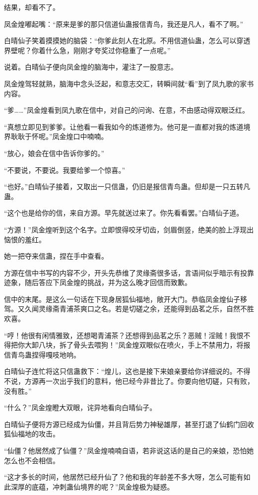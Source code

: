 \begin{this_body}
结果，却看不了。

凤金煌嘟起嘴：“原来是爹的那只信道仙蛊报信青鸟，我还是凡人，看不了啊。”

白晴仙子笑着摸摸她的脑袋：“你爹此刻人在北原。不用信道仙蛊，怎么可以穿透界壁呢？你着什么急，刚刚才夸奖过你稳重了一点呢。”

说着。白晴仙子便向凤金煌的脑海中，灌注了一股意志。

凤金煌驾轻就熟，脑海中念头泛起，和意志交汇，转瞬间就“看”到了凤九歌的家书内容。

“爹……”凤金煌看到凤九歌在信中，对自己的问询、在意，不由感动得双眼泛红。

“真想立即见到爹爹。让他看一看我如今的炼道修为。他可是一直都对我的炼道境界耿耿于怀呢。”凤金煌口中喃喃。

“放心，娘会在信中告诉你爹的。”

“不要说，不要说。我要给爹一个惊喜。”

“也好。”白晴仙子接着，又取出一只信蛊，仍旧是报信青鸟蛊。但却是一只五转凡蛊。

“这个也是给你的信，来自方源。早先就送过来了。你先看看罢。”白晴仙子道。

“方源！”凤金煌听到这个名字。立即恨得咬牙切齿，剑眉倒竖，绝美的脸上浮现出恼恨的羞红。

她一把夺来信蛊，捏在手中查看。

方源在信中书写的内容不少，开头先恭维了灵缘斋很多话，言语间似乎暗示有投靠迹象，随后答应下凤金煌的挑战，并为这么晚才回信而致歉。

信中的末尾。是这么一句话在下现身居狐仙福地，敞开大门。恭临凤金煌仙子移驾。又久闻灵缘斋青浦茶爽口之名。若是切磋之余，还能得到品茗之乐，自然不胜欢喜。

“哼！他很有闲情雅致，还想喝青浦茶？还想得到品茗之乐？恶贼！淫贼！我恨不得把你大卸八块，拆了骨头去喂狗！”凤金煌双眼似在喷火，手上不禁用力，将报信青鸟蛊捏得嘎吱地响。

白晴仙子连忙将这只信蛊救下：“煌儿，这也是接下来娘亲要给你详细说的。不得不说，方源再一次出乎我们的意料，他已经今非昔比了。你要向他切磋，只有败，没有胜。”

“什么？”凤金煌瞪大双眼，诧异地看向白晴仙子。

白晴仙子便将方源已经成为仙僵，并且背后势力神秘雄厚，甚至打退了仙鹤门回收狐仙福地的攻击。

“仙僵？他居然成了仙僵？”凤金煌喃喃自语，若非说这话的是自己的亲娘，恐怕她怎么也不会相信。

“这才多长的时间，他居然已经升仙了？他和我的年龄差不多大呀，怎么可能有如此深厚的底蕴，冲刺蛊仙境界的呢？”凤金煌极为疑惑。


\end{this_body}
